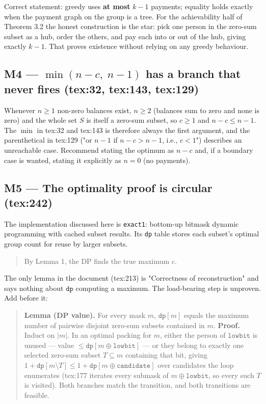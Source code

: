 \documentclass[11pt]{article}
\begin{document}
Correct statement: greedy uses \textbf{at most} $k-1$ payments; equality holds exactly when the payment
graph on the group is a tree. For the achievability half of Theorem 3.2 the honest construction is the
star: pick one person in the zero-sum subset as a hub, order the others, and pay each into or out of the
hub, giving exactly $k-1$. That proves existence without relying on any greedy behaviour.

\subsection{M4 --- $\min(n-c,\; n-1)$ has a branch that never fires (tex:32, tex:143, tex:129)}

Whenever $n \ge 1$ non-zero balances exist, $n \ge 2$ (balances sum to zero and none is zero) and the whole
set $S$ is itself a zero-sum subset, so $c \ge 1$ and $n - c \le n - 1$. The $\min$ in tex:32 and tex:143
is therefore always the first argument, and the parenthetical in tex:129 ("or $n-1$ if $n-c > n-1$,
i.e., $c < 1$") describes an unreachable case. Recommend stating the optimum as $n-c$ and, if a boundary
case is wanted, stating it explicitly as $n = 0$ (no payments).

\subsection{M5 --- The optimality proof is circular (tex:242)}

The implementation discussed here is \texttt{exact1}: bottom-up bitmask
dynamic programming with cached subset results. Its \texttt{dp} table
stores each subset's optimal group count for reuse by larger subsets.

\begin{quote}
  By Lemma 1, the DP finds the true maximum $c$.
\end{quote}

The only lemma in the document (tex:213) is "Correctness of reconstruction" and says nothing about
$\texttt{dp}$ computing a maximum. The load-bearing step is unproven. Add before it:

\begin{quote}
  \textbf{Lemma (DP value).} For every mask $m$, $\texttt{dp}[m]$ equals the maximum number of pairwise
disjoint zero-sum subsets contained in $m$.
  \textbf{Proof.} Induct on $|m|$. In an optimal packing for $m$, either the person of
$\texttt{lowbit}$ is unused --- value $\le \texttt{dp}[m \oplus \texttt{lowbit}]$ --- or they belong
to exactly one selected zero-sum subset $T \subseteq m$ containing that bit, giving
$1 + \texttt{dp}[m \setminus T] \le 1 + \texttt{dp}[m \oplus \texttt{candidate}]$ over candidates the
loop enumerates (tex:177 iterates every submask of $m \oplus \texttt{lowbit}$, so every such $T$ is
visited). Both branches match the transition, and both transitions are feasible.
\end{quote}
\end{document}
